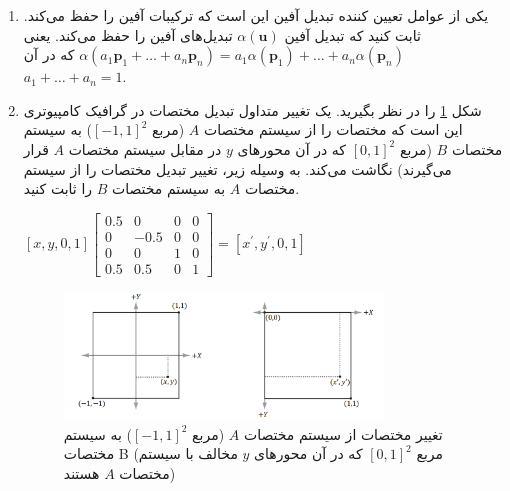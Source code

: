 {\begin{spacing}{1.5}
\begin{enumerate}[label=\textbf{\arabic*}.]
            \item {یکی از عوامل تعیین کننده تبدیل آفین این است که ترکیبات آفین را حفظ می‌کند.
            ثابت کنید که تبدیل آفین $\alpha(\textbf{u})$ تبدیل‌های آفین را حفظ می‌کند.
            یعنی $\alpha(a_{1}\textbf{p}_{1}+\dots+a_{n}\textbf{p}_{n})=a_{1}\alpha(\textbf{p}_{1})+\dots+a_{n}\alpha(\textbf{p}_{n})$ که در آن $a_{1}+\dots+a_{n}=1$.} \\\textbf{\vspace{6pt}}

            \item {
                شکل \ref{fig:4.Session.1.3.16} را در نظر بگیرید.
                یک تغییر متداول تبدیل مختصات در گرافیک کامپیوتری این است که مختصات را از سیستم مختصات $A$ (مربع $[-1,1]^{2}$) به سیستم مختصات $B$ (مربع $[0,1]^{2}$ که در آن محورهای $y$ در مقابل سیستم مختصات $A$ قرار می‌گیرند) نگاشت می‌کند.
                به وسیله زیر، تغییر تبدیل مختصات را از سیستم مختصات $A$ به سیستم مختصات $B$ را ثابت کنید.

                \begin{center}
                    $[x, y, 0, 1]\begin{bmatrix}
                                     0.5 & 0    & 0 & 0 \\
                                     0   & -0.5 & 0 & 0 \\
                                     0   & 0    & 1 & 0 \\
                                     0.5 & 0.5  & 0 & 1
                    \end{bmatrix}=[x^\prime, y^\prime, 0, 1]$
                \end{center}
                \begin{figure}[H]
                    \centering
                    \setlength{\belowcaptionskip}{-10pt}
                    \includegraphics[width=0.8\textwidth]{Images/4/3/4.Session.1.3.16}
                    \caption {تغییر مختصات از سیستم مختصات $A$ (مربع $[-1,1]^{2}$) به سیستم مختصات B (مربع $[0,1]^{2}$ که در آن محورهای $y$ مخالف با سیستم مختصات $A$ هستند)}
                    \label{fig:4.Session.1.3.16}
                \end{figure}
            }


\end{enumerate}
\end{spacing}}
